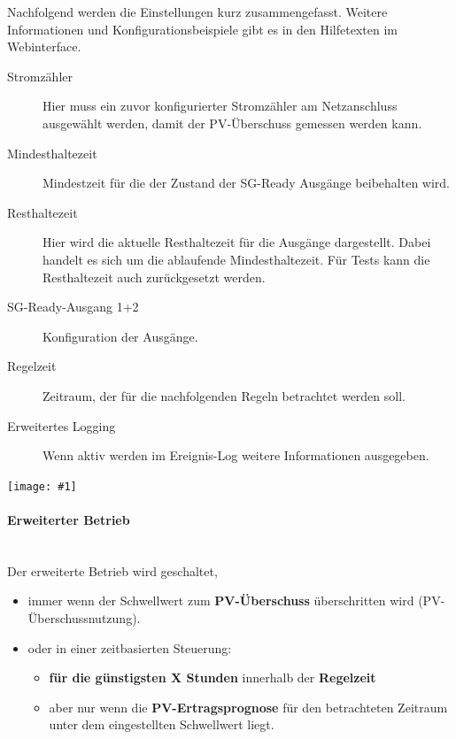 \documentclass[a4paper,10pt]{article}
\newcommand{\gfx}[1]{\texttt{[image: \#1]}}
\begin{document}
\begin{multicols*}{2}
    Nachfolgend werden die Einstellungen kurz zusammengefasst. Weitere Informationen und Konfigurationsbeispiele gibt es in den Hilfetexten
    im Webinterface.

   	\begin{description}
    \item[Stromzähler] Hier muss ein zuvor konfigurierter Stromzähler am Netzanschluss ausgewählt werden, damit der PV-Überschuss gemessen werden kann.
    \item[Mindesthaltezeit] Mindestzeit für die der Zustand der SG-Ready Ausgänge beibehalten wird.
    \item[Resthaltezeit] Hier wird die aktuelle Resthaltezeit für die Ausgänge dargestellt. Dabei handelt es sich um die ablaufende Mindesthaltezeit. Für Tests kann die Resthaltezeit auch zurückgesetzt werden.
    \item[SG-Ready-Ausgang 1+2] Konfiguration der Ausgänge.
    \item[Regelzeit] Zeitraum, der für die nachfolgenden Regeln betrachtet werden soll.
    \item[Erweitertes Logging] Wenn aktiv werden im Ereignis-Log weitere Informationen ausgegeben.
   	\end{description}


	\gfx{./img_v2/wem2-web-heater}

    \paragraph{Erweiterter Betrieb}\ \\
    Der erweiterte Betrieb wird geschaltet,
    \begin{itemize}
    \item immer wenn der Schwellwert zum \textbf{PV-Überschuss} überschritten wird (PV-Überschussnutzung).
    \item oder in einer zeitbasierten Steuerung:
    \begin{itemize}
    \item \textbf{für die günstigsten X Stunden} innerhalb der \textbf{Regelzeit}
    \item aber nur wenn die \textbf{PV-Ertragsprognose} für den betrachteten Zeitraum unter dem eingestellten Schwellwert liegt.
    \end{itemize}
   	\end{itemize}

	\vfill
	\null
	\columnbreak


\end{multicols*}
\end{document}

